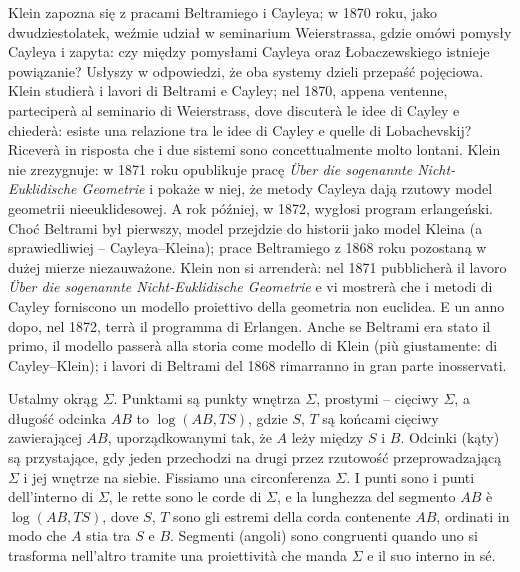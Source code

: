 Klein zapozna się z pracami Beltramiego i Cayleya; w 1870 roku, jako dwudziestolatek, weźmie udział w seminarium Weierstrassa, gdzie omówi pomysły Cayleya i zapyta: czy między pomysłami Cayleya oraz Łobaczewskiego istnieje powiązanie? %
Usłyszy w odpowiedzi, że oba systemy dzieli przepaść pojęciowa. %
Klein studierà i lavori di Beltrami e Cayley; nel 1870, appena ventenne, parteciperà al seminario di Weierstrass, dove discuterà le idee di Cayley e chiederà: esiste una relazione tra le idee di Cayley e quelle di Lobachevskij? %
Riceverà in risposta che i due sistemi sono concettualmente molto lontani. %
%
%
Klein nie zrezygnuje: w 1871 roku opublikuje pracę \emph{Über die sogenannte Nicht-Euklidische Geometrie} i pokaże w niej, że metody Cayleya dają rzutowy model geometrii nieeuklidesowej. %
A rok później, w 1872, wygłosi program erlangeński. %
Choć Beltrami był pierwszy, model przejdzie do historii jako model Kleina (a sprawiedliwiej -- Cayleya--Kleina); prace Beltramiego z 1868 roku pozostaną w dużej mierze niezauważone. %
Klein non si arrenderà: nel 1871 pubblicherà il lavoro \emph{Über die sogenannte Nicht-Euklidische Geometrie} e vi mostrerà che i metodi di Cayley forniscono un modello proiettivo della geometria non euclidea. %
E un anno dopo, nel 1872, terrà il programma di Erlangen. %
Anche se Beltrami era stato il primo, il modello passerà alla storia come modello di Klein (più giustamente: di Cayley--Klein); i lavori di Beltrami del 1868 rimarranno in gran parte inosservati. %

\begin{definition}
[model Beltramiego-Kleina] %
[modello di Beltrami-Klein] %
	Ustalmy okrąg $\Sigma$. %
	Punktami są punkty wnętrza $\Sigma$, prostymi -- cięciwy $\Sigma$, a długość odcinka $AB$ to $\log(AB, TS)$, gdzie $S$, $T$ są końcami cięciwy zawierającej $AB$, uporządkowanymi tak, że $A$ leży między $S$ i $B$. %
	Odcinki (kąty) są przystające, gdy jeden przechodzi na drugi przez rzutowość przeprowadzającą $\Sigma$ i jej wnętrze na siebie. %
	Fissiamo una circonferenza $\Sigma$. %
	I punti sono i punti dell'interno di $\Sigma$, le rette sono le corde di $\Sigma$, e la lunghezza del segmento $AB$ è $\log(AB, TS)$, dove $S$, $T$ sono gli estremi della corda contenente $AB$, ordinati in modo che $A$ stia tra $S$ e $B$. %
	Segmenti (angoli) sono congruenti quando uno si trasforma nell'altro tramite una proiettività che manda $\Sigma$ e il suo interno in sé. %
\end{definition}


